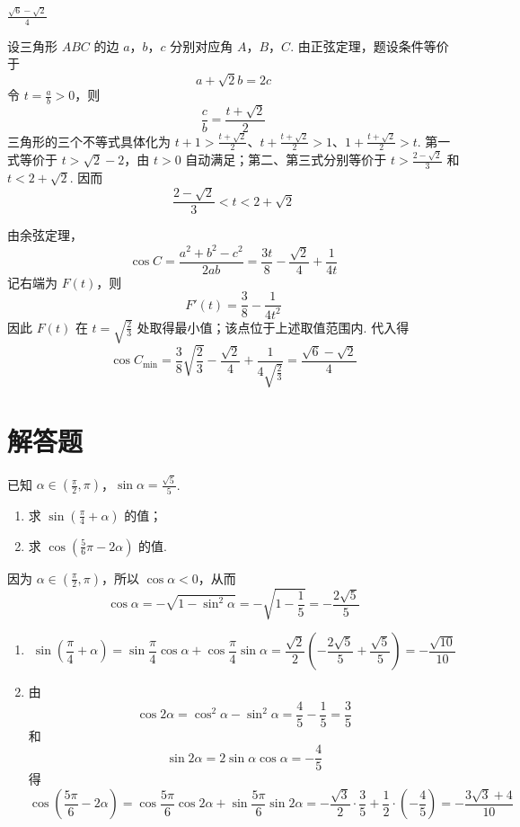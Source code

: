 \begin{answer}
\(\frac{\sqrt{6}-\sqrt{2}}{4}\)
\end{answer}

\begin{solution}
设三角形 \(ABC\) 的边 \(a\)，\(b\)，\(c\) 分别对应角 \(A\)，\(B\)，\(C\). 由正弦定理，题设条件等价于
\[
a+\sqrt2b=2c
\]
令 \(t=\frac ab>0\)，则
\[
\frac cb=\frac{t+\sqrt2}{2}
\]
三角形的三个不等式具体化为 \(t+1>\frac{t+\sqrt2}{2}\)、\(t+\frac{t+\sqrt2}{2}>1\)、\(1+\frac{t+\sqrt2}{2}>t\). 第一式等价于 \(t>\sqrt2-2\)，由 \(t>0\) 自动满足；第二、第三式分别等价于 \(t>\frac{2-\sqrt2}{3}\) 和 \(t<2+\sqrt2\). 因而
\[
\frac{2-\sqrt2}{3}<t<2+\sqrt2
\]

由余弦定理，
\[
\cos C=\frac{a^2+b^2-c^2}{2ab}
=\frac{3t}{8}-\frac{\sqrt2}{4}+\frac1{4t}
\]
记右端为 \(F(t)\)，则
\[
F'(t)=\frac38-\frac1{4t^2}
\]
因此 \(F(t)\) 在 \(t=\sqrt{\frac23}\) 处取得最小值；该点位于上述取值范围内. 代入得
\[
\cos C_{\min}=\frac38\sqrt{\frac23}-\frac{\sqrt2}{4}+\frac1{4\sqrt{\frac23}}
=\frac{\sqrt6-\sqrt2}{4}
\]
\end{solution}

\section{解答题}

\begin{problem}
已知 \(\alpha \in \left(\frac{\pi}{2}, \pi\right)\)，\(\sin \alpha = \frac{\sqrt{5}}{5}\).
\begin{enumerate}
\item 求 \( \sin\left(\frac{\pi}{4}+\alpha\right) \) 的值；
\item 求 \( \cos\left(\frac{5}{6}\pi - 2\alpha\right) \) 的值.
\end{enumerate}
\end{problem}

\begin{solution}
因为 \(\alpha\in\left(\frac{\pi}{2},\pi\right)\)，所以 \(\cos\alpha<0\)，从而
\[
\cos\alpha=-\sqrt{1-\sin^2\alpha}=-\sqrt{1-\frac15}=-\frac{2\sqrt5}{5}
\]

\begin{enumerate}
\item
\[
\sin\left(\frac{\pi}{4}+\alpha\right)=\sin\frac{\pi}{4}\cos\alpha+\cos\frac{\pi}{4}\sin\alpha=\frac{\sqrt2}{2}\left(-\frac{2\sqrt5}{5}+\frac{\sqrt5}{5}\right)=-\frac{\sqrt{10}}{10}
\]

\item 由
\[
\cos2\alpha=\cos^2\alpha-\sin^2\alpha=\frac45-\frac15=\frac35
\]
和
\[
\sin2\alpha=2\sin\alpha\cos\alpha=-\frac45
\]
得
\[
\cos\left(\frac{5\pi}{6}-2\alpha\right)=\cos\frac{5\pi}{6}\cos2\alpha+\sin\frac{5\pi}{6}\sin2\alpha=-\frac{\sqrt3}{2}\cdot\frac35+\frac12\cdot\left(-\frac45\right)=-\frac{3\sqrt3+4}{10}
\]
\end{enumerate}
\end{solution}

